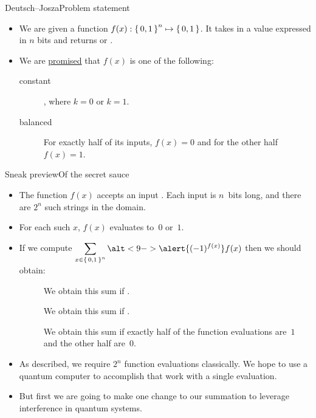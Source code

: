 \begin{frame}{Deutsch--Josza}{Problem statement}
\begin{itemize}[<+->]
    \item We are given a function $f(x): \left\{\,0,1\,\right\}^{n}\mapsto \left\{\,0,1\,\right\}$.  It takes in a value expressed in $n$ bits and returns \True{} or \False{}.
    \item We are \href{https://en.wikipedia.org/wiki/Promise_problem}{promised} that $f(x)$ is one of the following:
    \begin{description}
        \item[constant]  , where $k=0$ or $k=1$.
        \item[balanced]  For exactly half of its inputs, $f(x) = 0$ and for the other half $f(x) = 1$.
    \end{description}
\end{itemize}
\end{frame}

\begin{frame}{Sneak preview}{Of the secret sauce}
\Vskip{-3.5em}\begin{itemize}[<+->]
    \item The function $f(x)$ accepts an input .  Each input is $n$~bits long, and \alert<10->{there are $2^n$ such strings} in the domain.
    \item For each such $x$, $f(x)$ evaluates to~$0$ or~$1$.  
    \item If we compute $\SumBV{x}{n} \alt<9->{\alert{\NegF{x}}}{f(x)}$ then we should obtain:
    \begin{description}
        \item[]  We obtain this sum if .
        \item[]  We obtain this sum if .
        \item[]  \textcolor<14->{\RCtwo}{We obtain this sum if exactly half of the function evaluations are~$1$ and the other half are~$0$.}
    \end{description}
    \item As described, we require $2^n$ function evaluations classically.  We hope to use a quantum computer to accomplish that work with a single evaluation.
    \item But first we are going to make \alert{one change} to our summation to leverage \textcolor<14->{\RCtwo}{interference} in quantum systems.
\end{itemize}
    
\end{frame}

